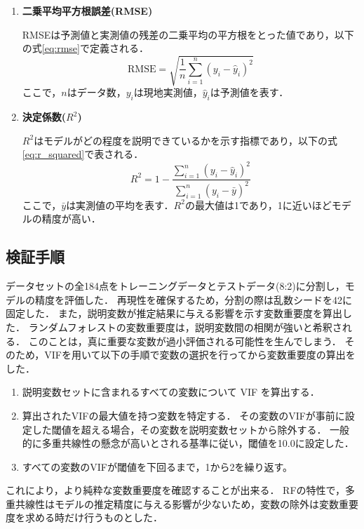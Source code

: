 \documentclass[12pt,epsf]{jreport}
\begin{document}
\begin{enumerate}
    \item \textbf{二乗平均平方根誤差(RMSE)}
    
    RMSEは予測値と実測値の残差の二乗平均の平方根をとった値であり，以下の式\ref{eq:rmse}で定義される．
    \begin{equation}
      \text{RMSE} = \sqrt{\frac{1}{n} \sum_{i=1}^{n} (y_i - \hat{y}_i)^2}
      \label{eq:rmse}
    \end{equation}
    ここで，$n$はデータ数，$y_i$は現地実測値，$\hat{y}_i$は予測値を表す．
    \item \textbf{決定係数($R^2$)}
    
    $R^2$はモデルがどの程度を説明できているかを示す指標であり，以下の式\ref{eq:r_squared}で表される．
    \begin{equation}
      R^2 = 1 - \frac{\sum_{i=1}^{n} (y_i - \hat{y}_i)^2}{\sum_{i=1}^{n} (y_i - \bar{y})^2}
      \label{eq:r_squared}
    \end{equation}
    ここで，$\bar{y}$は実測値の平均を表す．$R^2$の最大値は1であり，1に近いほどモデルの精度が高い．
\end{enumerate}

\subsection{検証手順}
データセットの全184点をトレーニングデータとテストデータ(8:2)に分割し，モデルの精度を評価した．
再現性を確保するため，分割の際は乱数シードを42に固定した．
また，説明変数が推定結果に与える影響を示す変数重要度を算出した．
ランダムフォレストの変数重要度は，説明変数間の相関が強いと希釈される\cite{gregorutti2017correlation}．
このことは，真に重要な変数が過小評価される可能性を生んでしまう．
そのため，VIFを用いて以下の手順で変数の選択を行ってから変数重要度の算出をした．
\begin{enumerate}
  \item 説明変数セットに含まれるすべての変数について VIF を算出する．
  \item 算出されたVIFの最大値を持つ変数を特定する．
  その変数のVIFが事前に設定した閾値を超える場合，その変数を説明変数セットから除外する．
  一般的に多重共線性の懸念が高いとされる基準に従い，閾値を10.0に設定した．
  \item すべての変数のVIFが閾値を下回るまで，1から2を繰り返す。
\end{enumerate}
これにより，より純粋な変数重要度を確認することが出来る．
RFの特性で，多重共線性はモデルの推定精度に与える影響が少ないため，変数の除外は変数重要度を求める時だけ行うものとした．
\end{document}
